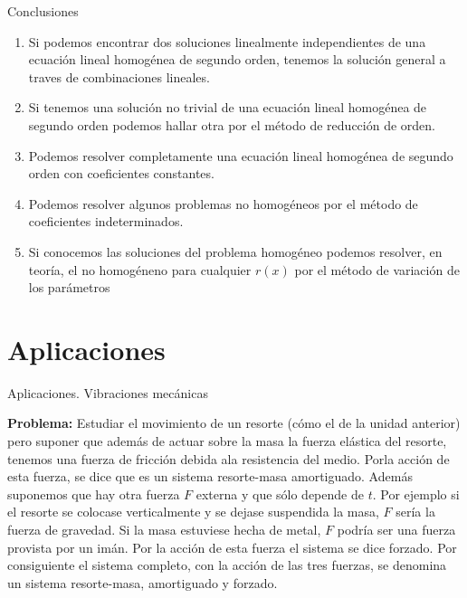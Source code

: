\documentclass[handout,hyperref={colorlinks=true}]{beamer}
\begin{document}
\begin{frame}{Conclusiones}
\begin{enumerate}
 \item Si podemos encontrar dos soluciones linealmente independientes de una ecuación lineal homogénea de segundo orden, tenemos la solución general a traves de 
 combinaciones lineales.
 \item Si tenemos una solución no trivial de una ecuación lineal homogénea de segundo orden podemos hallar otra por el método de reducción de orden.
 \item Podemos resolver completamente una ecuación lineal homogénea de segundo orden con coeficientes constantes.
 \item Podemos resolver algunos problemas no homogéneos por el método de coeficientes indeterminados.
 \item Si conocemos las soluciones del problema homogéneo podemos resolver, en teoría, el no homogéneno para cualquier $r(x)$ por el método de variación 
 de los parámetros
\end{enumerate}

\end{frame}

\section{Aplicaciones}

\begin{frame}{Aplicaciones. Vibraciones mecánicas }
 
\textbf{Problema:} Estudiar el movimiento de un resorte (cómo el de la unidad anterior) pero suponer que además de actuar sobre la masa la fuerza elástica del resorte,
tenemos una fuerza de fricción debida ala resistencia del medio. Porla acción de esta fuerza, se dice que es un sistema resorte-masa amortiguado.
Además suponemos que hay otra fuerza $F$ externa y que sólo depende de $t$. Por ejemplo si el resorte se colocase verticalmente y se dejase suspendida 
la masa, $F$ sería la fuerza de gravedad. Si la masa estuviese hecha de metal, $F$ podría ser una fuerza provista por un imán. Por la acción de esta fuerza el sistema se 
dice forzado. Por consiguiente el sistema completo, con la acción de las tres fuerzas, se denomina un sistema resorte-masa, amortiguado y forzado.
\end{frame}
\end{document}
